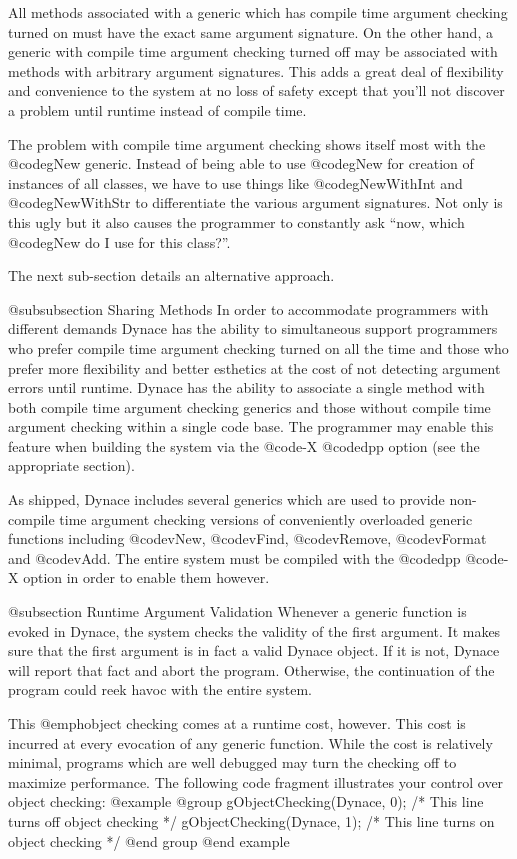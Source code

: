 All methods associated with a generic which has compile time argument
checking turned on must have the exact same argument signature.  On the
other hand, a generic with compile time argument checking turned off
may be associated with methods with arbitrary argument signatures.
This adds a great deal of flexibility and convenience to the system
at no loss of safety except that you'll not discover a problem
until runtime instead of compile time.


The problem with compile time argument checking shows itself most with
the @code{gNew} generic.  Instead of being able to use @code{gNew}
for creation of instances of all classes, we have to use things
like @code{gNewWithInt} and @code{gNewWithStr} to differentiate
the various argument signatures.  Not only is this ugly but it also
causes the programmer to constantly ask ``now, which @code{gNew} do
I use for this class?''.

The next sub-section details an alternative approach.

@subsubsection Sharing Methods
In order to accommodate programmers with different demands Dynace has the
ability to simultaneous support programmers who prefer compile time
argument checking turned on all the time and those who prefer more
flexibility and better esthetics at the cost of not detecting argument 
errors until runtime.  Dynace has the ability to associate a single
method with both compile time argument checking generics and those
without compile time argument checking within a single code base.  The
programmer may enable this feature when building the system via the
@code{-X} @code{dpp} option (see the appropriate section).

As shipped, Dynace includes several generics which are used to provide
non-compile time argument checking versions of conveniently overloaded
generic functions including @code{vNew}, @code{vFind}, @code{vRemove},
@code{vFormat} and @code{vAdd}.  The entire system must be compiled with
the @code{dpp} @code{-X} option in order to enable them however.

@subsection Runtime Argument Validation
Whenever a generic function is evoked in Dynace, the system checks the
validity of the first argument.  It makes sure that the first argument
is in fact a valid Dynace object.  If it is not, Dynace will report that fact
and abort the program.  Otherwise, the continuation of the program could reek
havoc with the entire system.

This @emph{object checking} comes at a runtime cost, however.  This cost
is incurred at every evocation of any generic function.  While the cost
is relatively minimal, programs which are well debugged may turn the
checking off to maximize performance.  The following code fragment
illustrates your control over object checking:
@example
@group
gObjectChecking(Dynace, 0);  /* This line turns off object checking */
gObjectChecking(Dynace, 1);  /* This line turns on  object checking */
@end group
@end example

